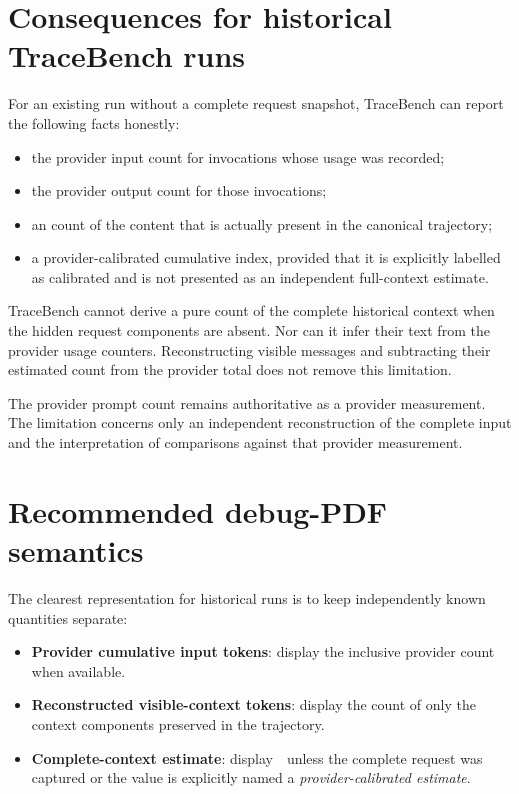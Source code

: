 \documentclass[11pt]{article}
\begin{document}
\section*{Consequences for historical TraceBench runs}

For an existing run without a complete request snapshot, TraceBench can report the
following facts honestly:
\begin{itemize}
  \item the provider input count for invocations whose usage was recorded;
  \item the provider output count for those invocations;
  \item an  count of the content that is actually present in the
  canonical trajectory;
  \item a provider-calibrated cumulative index, provided that it is explicitly
  labelled as calibrated and is not presented as an independent full-context
  estimate.
\end{itemize}

TraceBench cannot derive a pure  count of the complete historical
context when the hidden request components are absent.  Nor can it infer their text
from the provider usage counters.  Reconstructing visible messages and subtracting
their estimated count from the provider total does not remove this limitation.

The provider prompt count remains authoritative as a provider measurement.  The
limitation concerns only an independent reconstruction of the complete input and
the interpretation of comparisons against that provider measurement.


\section*{Recommended debug-PDF semantics}

The clearest representation for historical runs is to keep independently known
quantities separate:
\begin{itemize}
  \item \textbf{Provider cumulative input tokens}: display the inclusive provider
  count when available.
  \item \textbf{Reconstructed visible-context tokens}: display the
   count of only the context components preserved in the
  trajectory.
  \item \textbf{Complete-context estimate}: display \,\code{-}\, unless the complete
  request was captured or the value is explicitly named a
  \emph{provider-calibrated estimate}.
\end{itemize}
\end{document}
